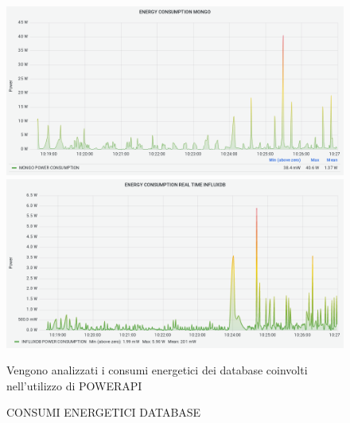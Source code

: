 \documentclass[a4paper, 11pt]{article}
\begin{document}
\begin{figure}[h]
\caption{CONSUMI ENERGETICI DATABASE}
\centering
\includegraphics[scale=0.4]{image4}
\includegraphics[scale=0.4]{image7}
\begin{flushleft}
{Vengono analizzati i consumi energetici dei database coinvolti nell'utilizzo di POWERAPI}
\end{flushleft}
\end{figure}
\end{document}
